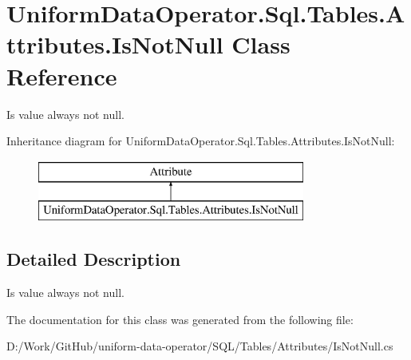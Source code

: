 \hypertarget{class_uniform_data_operator_1_1_sql_1_1_tables_1_1_attributes_1_1_is_not_null}{}\section{Uniform\+Data\+Operator.\+Sql.\+Tables.\+Attributes.\+Is\+Not\+Null Class Reference}
\label{class_uniform_data_operator_1_1_sql_1_1_tables_1_1_attributes_1_1_is_not_null}


Is value always not null.  


Inheritance diagram for Uniform\+Data\+Operator.\+Sql.\+Tables.\+Attributes.\+Is\+Not\+Null\+:\begin{figure}[H]
\begin{center}
\leavevmode
\includegraphics[height=2.000000cm]{d8/de9/class_uniform_data_operator_1_1_sql_1_1_tables_1_1_attributes_1_1_is_not_null}
\end{center}
\end{figure}


\subsection{Detailed Description}
Is value always not null. 



The documentation for this class was generated from the following file\+:\begin{DoxyCompactItemize}
\item 
D\+:/\+Work/\+Git\+Hub/uniform-\/data-\/operator/\+S\+Q\+L/\+Tables/\+Attributes/Is\+Not\+Null.\+cs\end{DoxyCompactItemize}
